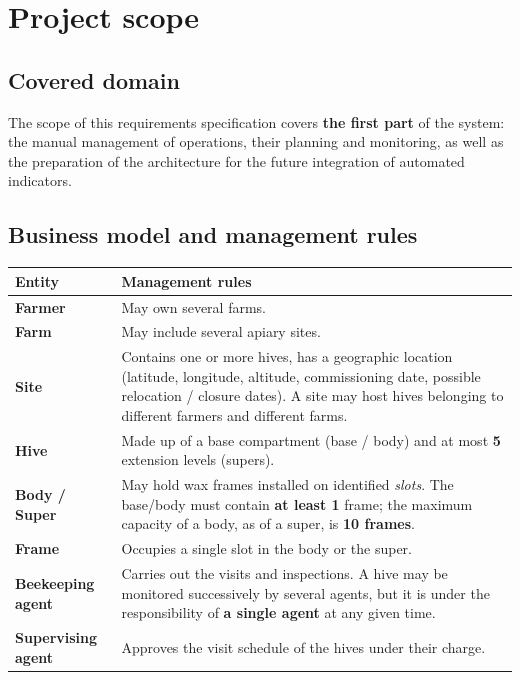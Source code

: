 \chapter{Project scope}

\section{Covered domain}
The scope of this requirements specification covers \textbf{the first part} of
the system: the manual management of operations, their planning and monitoring,
as well as the preparation of the architecture for the future integration of
automated indicators.

\section{Business model and management rules}
\begin{xltabular}{\textwidth}{>{\bfseries}p{3cm} X}
\toprule
\textbf{Entity} & \textbf{Management rules} \\
\midrule
\endhead
Farmer   & May own several farms. \\
Farm     & May include several apiary sites. \\
Site     & Contains one or more hives, has a geographic location (latitude, longitude, altitude, commissioning date, possible relocation / closure dates). A site may host hives belonging to different farmers and different farms. \\
Hive     & Made up of a base compartment (base / body) and at most \textbf{5} extension levels (supers). \\
Body / Super & May hold wax frames installed on identified \emph{slots}. The base/body must contain \textbf{at least 1} frame; the maximum capacity of a body, as of a super, is \textbf{10 frames}. \\
Frame    & Occupies a single slot in the body or the super. \\
Beekeeping agent & Carries out the visits and inspections. A hive may be monitored successively by several agents, but it is under the responsibility of \textbf{a single agent} at any given time. \\
Supervising agent & Approves the visit schedule of the hives under their charge. \\
\bottomrule
\end{xltabular}

